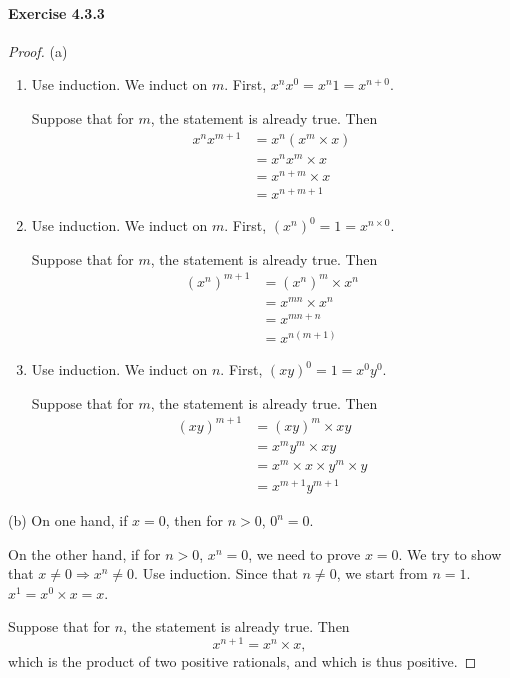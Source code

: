 \paragraph{Exercise 4.3.3} \label{exercise4.3.3}
\begin{proof}
(a)
\begin{enumerate}
\item Use induction. We induct on $m$. First, $x^nx^0 = x^n1 = x^{n+0}$.

Suppose that for $m$, the statement is already true. Then 
\begin{align*}
x^nx^{m+1} 
&= x^n(x^m\times x)\\
&= x^nx^m \times x \\
&= x^{n+m} \times x \tag{The induction hypothesis} \\
&= x^{n+m+1}
\end{align*}

\item Use induction. We induct on $m$. First, $(x^n)^0 = 1 = x^{n\times 0}$.

Suppose that for $m$, the statement is already true. Then 
\begin{align*}
(x^n)^{m+1} 
&= (x^n)^m \times x^n \\
&= x^{mn} \times x^n \tag{The induction hypothesis} \\
&= x^{mn + n} \tag{By the previous statement} \\
&= x^{n(m+1)}
\end{align*}

\item Use induction. We induct on $n$. First, $(xy)^0 = 1 = x^0y^0$.

Suppose that for $m$, the statement is already true. Then 
\begin{align*}
(xy)^{m+1} 
&= (xy)^m \times xy \\
&= x^my^m \times xy \tag{The induction hypothesis} \\
&= x^m \times x \times y^m \times y \\
&= x^{m+1} y^{m+1}
\end{align*}
\end{enumerate}

(b)
On one hand, if $x=0$, then for $n>0$, $0^n=0$.

On the other hand, if for $n>0$, $x^n=0$, we need to prove $x=0$. We try to show that 
$x \neq 0 \Longrightarrow x^n \neq 0$. Use induction. Since that $n\neq 0$, we start from $n=1$. 
$x^1 = x^0 \times x = x$. 

Suppose that for $n$, the statement is already true. Then 
\[
x^{n+1} = x^n \times x,
\]
which is the product of two positive rationals, and which is thus positive. 


\end{proof}
